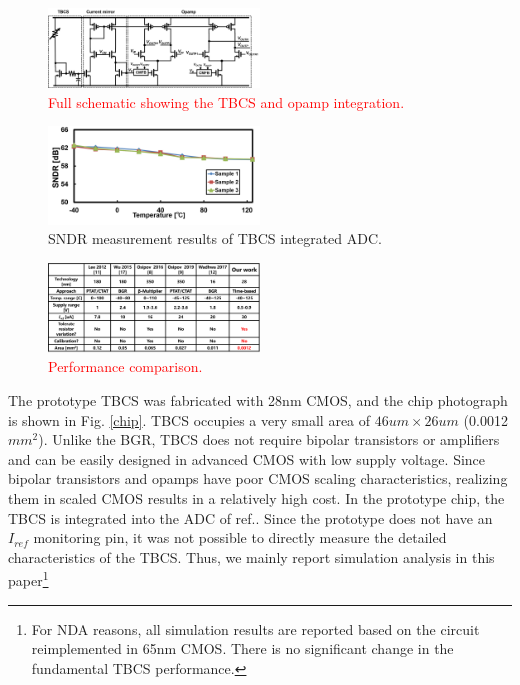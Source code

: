 \documentclass[paper]{ieice}
\begin{document}
\begin{figure}[!t]
\centering
 \includegraphics[width=0.5\textwidth]{figs/opamp.png}
  \caption{\textcolor{red}{Full schematic showing the TBCS and opamp integration.}}
\label{opamp}
\end{figure}

\begin{figure}[!t]
\centering
 \includegraphics[width=0.5\textwidth]{figs/sndr.png}
  \caption{SNDR measurement results of TBCS integrated ADC.}
\label{sndr}
\end{figure}

\begin{figure}[!t]
\centering
 \includegraphics[width=0.5\textwidth]{figs/comparison.png}
  \caption{\textcolor{red}{Performance comparison.}}
\label{comparison}
\end{figure}

\qquad The prototype TBCS was fabricated with 28nm CMOS, and the chip photograph is shown in Fig. \ref{chip}. TBCS occupies a very small area of $46um \times 26um$ (0.0012$mm^2$). Unlike the BGR, TBCS does not require bipolar transistors or amplifiers and can be easily designed in advanced CMOS with low supply voltage. Since bipolar transistors and opamps have poor CMOS scaling characteristics, realizing them in scaled CMOS results in a relatively high cost. In the prototype chip, the TBCS is integrated into the ADC of ref.\cite{yoshioka201728}. Since the prototype does not have an $I_{ref}$ monitoring pin, it was not possible to directly measure the detailed characteristics of the TBCS. Thus, we mainly report simulation analysis in this paper\footnote{For NDA reasons, all simulation results are reported based on the circuit reimplemented in 65nm CMOS. There is no significant change in the fundamental TBCS performance.}
\end{document}
